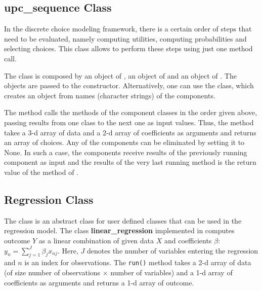 {\subsection{upc_sequence Class}
\label{sec:upc-sequence}

In the discrete choice modeling framework, there is a certain order of steps
that need to be evaluated, namely computing utilities, computing
probabilities and selecting choices. This class allows to perform these steps
using just one method call.

The class  is composed by an object of ,
an object of  and an object of . The
objects are passed to the constructor. Alternatively, one can use the
 class, which creates an  object from
names (character strings) of the components.

The  method calls the  methods of the component
classes in the order given above, passing results from one class to the next
one as input values. Thus, the method takes a 3-d array of data and a 2-d
array of coefficients \coefficientsindex as arguments and returns an array of choices.  Any of
the components can be eliminated by setting it to None. In such a case, the
components receive results of the previously running component as input and
the results of the very last running method is the return value of the
 method of .

\subsection{Regression Class}
\label{sec:regression}

The  class is an abstract class for user defined classes
that can be used in the regression model. The class {\bf linear_regression}
implemented in  computes outcome $Y$ as a linear combination of given
data $X$ and coefficients \coefficientsindex \boldmath $\beta$\unboldmath: $y_n = \sum_{j=1}^J
\beta_j x_{nj}$. Here, $J$ denotes the number of variables \variablesindex entering the
regression and $n$ is an index for observations. The \verb|run()| method takes
a 2-d array of data (of size number of observations $\times$ number of
variables) and a 1-d array of coefficients \coefficientsindex as arguments and returns a 1-d
array of outcome.

}
